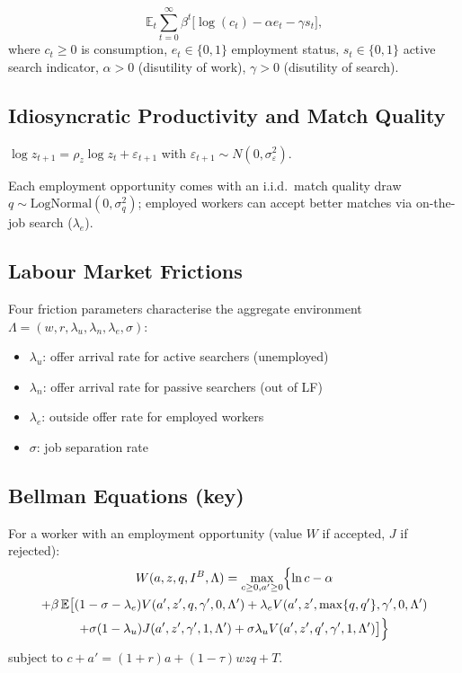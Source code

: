 \begin{equation}
  \mathbb{E}_t \sum_{t=0}^{\infty}\beta^t\bigl[\log(c_t) - \alpha e_t
    - \gamma s_t\bigr],
  \label{eq:kmrs_prefs}
\end{equation}
where $c_t\geq 0$ is consumption, $e_t\in\{0,1\}$ employment status,
$s_t\in\{0,1\}$ active search indicator, $\alpha>0$ (disutility of work),
$\gamma>0$ (disutility of search).

\subsection*{Idiosyncratic Productivity and Match Quality}

$\log z_{t+1} = \rho_z\log z_t + \varepsilon_{t+1}$ with
$\varepsilon_{t+1}\sim N(0,\sigma_\varepsilon^2)$.

Each employment opportunity comes with an i.i.d.\ match quality draw
$q\sim\text{LogNormal}(0,\sigma_q^2)$; employed workers can accept better
matches via on-the-job search ($\lambda_e$).

\subsection*{Labour Market Frictions}

Four friction parameters characterise the aggregate environment
$\Lambda=(w,r,\lambda_u,\lambda_n,\lambda_e,\sigma)$:
\begin{itemize}
  \item $\lambda_u$: offer arrival rate for active searchers (unemployed)
  \item $\lambda_n$: offer arrival rate for passive searchers (out of LF)
  \item $\lambda_e$: outside offer rate for employed workers
  \item $\sigma$: job separation rate
\end{itemize}

\subsection*{Bellman Equations (key)}

For a worker with an employment opportunity (value $W$ if accepted, $J$ if
rejected):
\begin{multline}
  W(a,z,q,I^B,\Lambda) = \max_{c\geq 0,a'\geq 0}\Bigl\{\ln c - \alpha \\
    + \beta\,\mathbb{E}\bigl[(1-\sigma-\lambda_e)V(a',z',q,\gamma',0,\Lambda')
    + \lambda_e V(a',z',\max\{q,q'\},\gamma',0,\Lambda') \\
    + \sigma(1-\lambda_u)J(a',z',\gamma',1,\Lambda')
    + \sigma\lambda_u V(a',z',q',\gamma',1,\Lambda')\bigr]\Bigr\}
\end{multline}
subject to $c+a'=(1+r)a+(1-\tau)wzq+T$.

